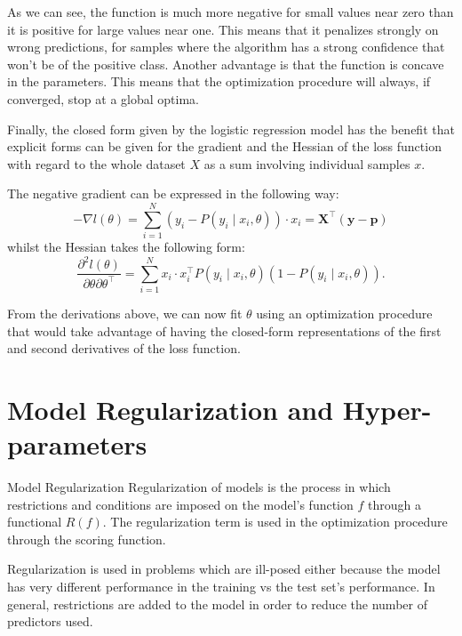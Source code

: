 As we can see, the function is much more negative for small values near zero than it is positive for large values near one. This means that it penalizes strongly on wrong predictions, for samples where the algorithm has a strong confidence that won't be of the positive class. Another advantage is that the function is concave in the parameters. This means that the optimization procedure will always, if converged, stop at a global optima.

Finally, the closed form given by the logistic regression model has the benefit that explicit forms can be given for the gradient and the Hessian of the loss function with regard to the whole dataset $X$ as a sum involving individual samples $x$.

The negative gradient can be expressed in the following way: %
\begin{equation}\label{eq:logitHessian1}
- \nabla l(\theta) = \sum_{i=1}^N (y_i - P(y_i \mid x_i,\theta))\cdot x_i = \textbf{X}^{\intercal}(\textbf{y}-\textbf{p})
\end{equation}
whilst the Hessian takes the following form:
\begin{equation}\label{eq:logitHessian2}
\frac{\partial^2 l(\theta)}{\partial \theta \partial \theta^\intercal} = \sum_{i=1}^N x_i \cdot x_i^\intercal P(y_i \mid x_i,\theta)(1 -P(y_i \mid x_i,\theta)) .
\end{equation}

From the derivations above, we can now fit $\theta$ using an optimization procedure that would take advantage of having the closed-form representations of the first and second derivatives of the loss function.


\section{Model Regularization and Hyper-parameters}\label{section-hyperParametersRegularization}


\begin{definition}{Model Regularization}
Regularization of models is the process in which restrictions and conditions are imposed on the model's function $f$ through a functional $ R(f)$. The regularization term is used in the optimization procedure through the scoring function.
\end{definition}

Regularization is used in problems which are ill-posed either because the model has very different performance in the training vs the test set's performance. In general, restrictions are added to the model in order to reduce the number of predictors used.

